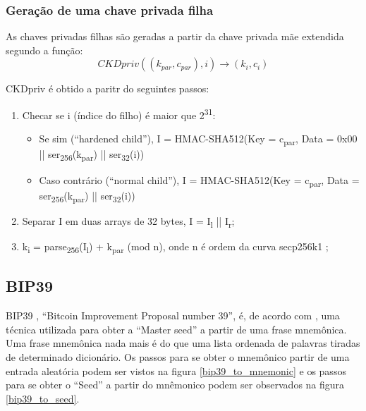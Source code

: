 \subsubsection{Geração de uma chave privada filha}

As chaves privadas filhas são geradas a partir da chave privada mãe extendida segundo a função: 
\[CKDpriv((k_{par}, c_{par}), i) \rightarrow (k_{i}, c_{i})\]

CKDpriv é obtido a paritr do seguintes passos:

\begin{enumerate}
\item Checar se i (índice do filho) é maior que 2\textsuperscript{31}:
  \begin{itemize}
  \item Se sim (``hardened child''), I = HMAC-SHA512(Key = c\textsubscript{par}, Data = 0x00 || ser\textsubscript{256}(k\textsubscript{par}) || ser\textsubscript{32}(i))
  \item Caso contrário (``normal child''), I = HMAC-SHA512(Key = c\textsubscript{par}, Data = ser\textsubscript{256}(k\textsubscript{par}) || ser\textsubscript{32}(i)) 
  \end{itemize}
\item Separar I em duas arrays de 32 bytes, I = I\textsubscript{l} || I\textsubscript{r};
\item k\textsubscript{i} = parse\textsubscript{256}(I\textsubscript{l}) + k\textsubscript{par} (mod n), onde n é ordem da curva secp256k1 \cite{secp256k1};
\end{enumerate}

\subsection{BIP39}

BIP39 \cite{github_bip39}, ``Bitcoin Improvement Proposal number 39'', é, de acordo com \cite{fornaro_thesis}, uma técnica utilizada para obter a ``Master seed'' a partir de uma frase mnemônica. Uma frase mnemônica nada mais é do que uma lista ordenada de palavras tiradas de determinado dicionário. Os passos para se obter o mnemônico  partir de uma entrada aleatória podem ser vistos na figura \ref{bip39_to_mnemonic} e os passos para se obter o ``Seed'' a partir do mnêmonico podem ser observados na figura \ref{bip39_to_seed}.

